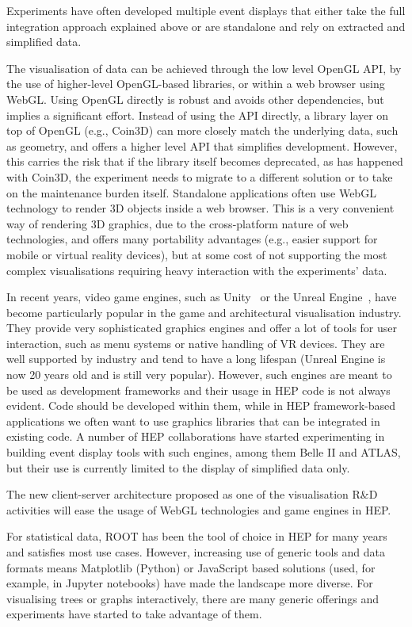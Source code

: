 Experiments have often developed multiple event displays that either
take the full integration approach explained above or are standalone and
rely on extracted and simplified data.

The visualisation of data can be achieved through the low level OpenGL
API, by the use of higher-level OpenGL-based libraries, or within a web
browser using WebGL. Using OpenGL directly is robust and avoids other dependencies, but
implies a significant effort. Instead of using the API directly, a
library layer on top of OpenGL (e.g., Coin3D) can more closely match the
underlying data, such as geometry, and offers a higher level API that
simplifies development. However, this carries the risk that if the
library itself becomes deprecated, as has happened with Coin3D, the
experiment needs to migrate to a different solution or to take on the
maintenance burden itself. Standalone applications often use WebGL
technology to render 3D objects inside a web browser. This is a very
convenient way of rendering 3D graphics, due to the cross-platform
nature of web technologies, and offers many portability advantages (e.g.,
easier support for mobile or virtual reality devices), but at some cost
of not supporting the most complex visualisations requiring heavy
interaction with the experiments' data.

In recent years, video game engines, such as Unity~\cite{unity} or 
the Unreal Engine~\cite{Sanders:2016:IUE:3099885},
have become particularly popular in the game and architectural
visualisation industry. They provide very sophisticated graphics engines
and offer a lot of tools for user interaction, such as menu systems or
native handling of VR devices. They are well supported by industry and
tend to have a long lifespan (Unreal Engine is now  20 years old and
is still very popular). However, such engines are meant to be used as
development frameworks and their usage in HEP code is not always
evident. Code should be developed within them, while in HEP
framework-based applications we often want to use graphics libraries
that can be integrated in existing code. A number of HEP collaborations
have started experimenting in building event display tools with such
engines, among them Belle II and ATLAS, but their use is currently
limited to the display of simplified data only.

The new client-server architecture proposed as one of the visualisation
R\&D activities will ease the usage of WebGL technologies and game
engines in HEP.

For statistical data, ROOT has been the tool of choice in HEP for many
years and satisfies most use cases. However, increasing use of generic
tools and data formats means Matplotlib (Python) or JavaScript based
solutions (used, for example, in Jupyter notebooks) have made the
landscape more diverse. For visualising trees or graphs interactively,
there are many generic offerings and experiments have
started to take advantage of them.

